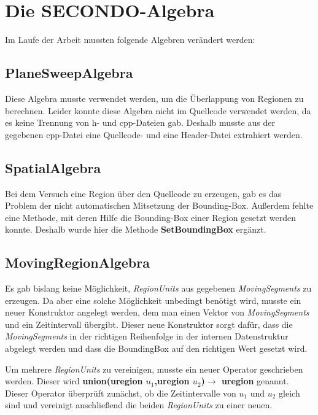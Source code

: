 \section{Die SECONDO-Algebra }\label{rialgebra}

Im Laufe der Arbeit mussten folgende Algebren verändert werden:

\subsection{PlaneSweepAlgebra}

Diese Algebra musste verwendet werden, um die Überlappung von Regionen zu berechnen. Leider konnte diese Algebra nicht im Quellcode verwendet werden, da es keine Trennung von h- und cpp-Dateien gab. Deshalb musste aus der gegebenen cpp-Datei eine Quellcode- und eine Header-Datei extrahiert werden.

\subsection{SpatialAlgebra}

Bei dem Versuch eine Region über den Quellcode zu erzeugen, gab es das Problem der nicht automatischen Mitsetzung der Bounding-Box. Außerdem fehlte eine Methode, mit deren Hilfe die Bounding-Box einer Region gesetzt werden konnte. Deshalb wurde hier die Methode \textbf{SetBoundingBox} ergänzt.

\subsection{MovingRegionAlgebra}

Es gab bislang keine Möglichkeit, \textit{RegionUnits} aus gegebenen \textit{MovingSegments} zu erzeugen. Da aber eine solche Möglichkeit  unbedingt  benötigt wird, musste ein neuer Konstruktor angelegt werden, dem man einen Vektor von \textit{MovingSegments} und ein Zeitintervall übergibt. Dieser neue Konstruktor sorgt dafür, dass die \textit{MovingSegments} in der richtigen Reihenfolge in der internen Datenstruktur abgelegt werden und dass die BoundingBox auf den richtigen Wert gesetzt wird.

Um mehrere \textit{RegionUnits} zu vereinigen, musste ein neuer Operator geschrieben werden. Dieser wird \textbf{union(uregion $u_1$,uregion $u_2$)$\rightarrow$ uregion} genannt. Dieser Operator überprüft zunächst, ob die Zeitintervalle von $u_1$ und $u_2$ gleich sind und vereinigt anschließend die beiden \textit{RegionUnits} zu einer neuen.

